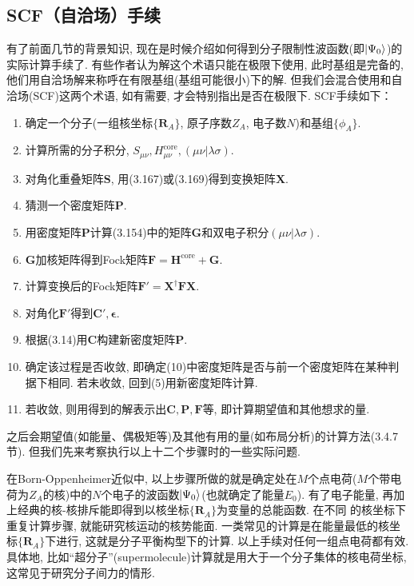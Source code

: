 \subsection{SCF（自洽场）手续}
有了前面几节的背景知识, 现在是时候介绍如何得到分子限制性波函数(即$\Ket{\Psi_0}$)的实际计算手续了. 有些作者认为\hft 解这个术语只能在\hft 极限下使用, 此时基组是完备的, 他们用自洽场解来称呼在有限基组(基组可能很小)下的解. 但我们会混合使用\hft 和自洽场(SCF)这两个术语, 如有需要, 才会特别指出是否在\hft 极限下. SCF手续如下：
\begin{enumerate}[1.]
	\item 确定一个分子(一组核坐标$\{\mathbf{R}_A\}$, 原子序数$Z_A$, 电子数$N$)和基组$\{\phi_A\}$.
	\item 计算所需的分子积分, $S_{\mu\nu},H_{\mu\nu}^\mathrm{core}, (\mu\nu|\lambda\sigma)$.
	\item 对角化重叠矩阵$\mathbf{S}$, 用(3.167)或(3.169)得到变换矩阵$\mathbf{X}$.
	\item 猜测一个密度矩阵$\mathbf{P}$.
	\item 用密度矩阵$\mathbf{P}$计算(3.154)中的矩阵$\mathbf{G}$和双电子积分$(\mu\nu|\lambda\sigma)$.
	\item $\mathbf{G}$加核\ha 矩阵得到Fock矩阵$\mathbf{F=H}^\mathrm{core}+\mathbf{G}$.
	\item 计算变换后的Fock矩阵$\mathbf{F'=X^\dagger FX}$.
	\item 对角化$\mathbf{F'}$得到$\mathbf{C'},\bm{\epsilon}$.
	\item 根据(3.14)用$\mathbf{C}$构建新密度矩阵$\mathbf{P}$.
	\item 确定该过程是否收敛, 即确定(10)中密度矩阵是否与前一个密度矩阵在某种判据下相同. 若未收敛, 回到(5)用新密度矩阵计算.
	\item 若收敛, 则用得到的解表示出$\mathbf{C,P,F}$等, 即计算期望值和其他想求的量.
\end{enumerate}
之后会期望值(如能量、偶极矩等)及其他有用的量(如布局分析)的计算方法(3.4.7节). 但我们先来考察执行以上十二个步骤时的一些实际问题.

在Born-Oppenheimer近似中, 以上步骤所做的就是确定处在$M$个点电荷($M$个带电荷为$Z_A$的核)中的$N$个电子的波函数$\Ket{\Psi_0}$(也就确定了能量$E_0$). 有了电子能量, 再加上经典的核-核排斥能即得到以核坐标$\{\mathbf{R}_A\}$为变量的总能函数. 在不同 的核坐标下重复计算步骤, 就能研究核运动的核势能面. 一类常见的计算是在能量最低的核坐标$\{\mathbf{R}_A\}$下进行, 这就是分子平衡构型下的计算. 以上手续对任何一组点电荷都有效. 具体地, 比如``超分子''(supermolecule)计算就是用大于一个分子集体的核电荷坐标, 这常见于研究分子间力的情形.

